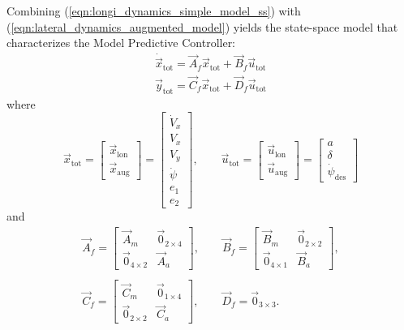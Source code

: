 Combining (\ref{eqn:longi_dynamics_simple_model_ss}) with (\ref{eqn:lateral_dynamics_augmented_model}) yields the state-space model that characterizes the Model Predictive Controller:
\begin{equation}
\label{eqn:full_dynamics_model}
\begin{array}{ll}
\dot{\vec{x}}_{\text{tot}} = \vec{A}_f \vec{x}_{\text{tot}}+ \vec{B}_f \vec{u}_{\text{tot}}\\
\vec{y}_{\text{tot}} = \vec{C}_f \vec{x}_{\text{tot}} + \vec{D}_f \vec{u}_{\text{tot}}
\end{array}
\end{equation}
where
\begin{equation}
\vec{x}_{\text{tot}} = \begin{bmatrix}
\vec{x}_{\text{lon}}\\\vec{x}_{\text{aug}}
\end{bmatrix} = \begin{bmatrix}
\dot{V}_x\\V_x\\V_y\\\dot{\psi}\\e_1\\e_2
\end{bmatrix},
\qquad
\vec{u}_{\text{tot}} = \begin{bmatrix}
\vec{u}_{\text{lon}}\\\vec{u}_{\text{aug}}
\end{bmatrix}  =
\begin{bmatrix}
a\\\delta\\\dot{\psi}_{\text{des}}
\end{bmatrix}
\end{equation}
and
\begin{equation}
\begin{array}{cc}
\vec{A}_f=\begin{bmatrix}
\vec{A}_m&\vec{0}_{2\times4}\\
\vec{0}_{4\times2}&\vec{A}_a
\end{bmatrix},
\qquad
\vec{B}_f=\begin{bmatrix}
\vec{B}_m&\vec{0}_{2\times2}\\
\vec{0}_{4\times1}&\vec{B}_a
\end{bmatrix},
\\\\
\vec{C}_f=\begin{bmatrix}
\vec{C}_m&\vec{0}_{1\times4}\\
\vec{0}_{2\times2}&\vec{C}_a
\end{bmatrix}, 
\qquad
\vec{D}_f=\vec{0}_{3\times3}. 
\end{array}
\end{equation} 

